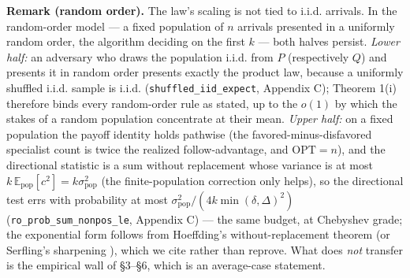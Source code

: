 \textbf{Remark (random order).} The law's scaling is not tied to i.i.d.
arrivals. In the random-order model --- a fixed population of \(n\)
arrivals presented in a uniformly random order, the algorithm deciding
on the first \(k\) --- both halves persist. \emph{Lower half:} an
adversary who draws the population i.i.d. from \(P\) (respectively
\(Q\)) and presents it in random order presents exactly the product law,
because a uniformly shuffled i.i.d. sample is i.i.d.
(\texttt{shuffled\_iid\_expect}, Appendix C); Theorem 1(i) therefore
binds every random-order rule as stated, up to the \(o(1)\) by which the
stakes of a random population concentrate at their mean. \emph{Upper
half:} on a fixed population the payoff identity holds pathwise (the
favored-minus-disfavored specialist count is twice the realized
follow-advantage, and \(\mathrm{OPT}=n\)), and the directional statistic
is a sum without replacement whose variance is at most
\(k\,\mathbb E_{\mathrm{pop}}[c^2]=k\sigma^2_{\mathrm{pop}}\) (the
finite-population correction only helps), so the directional test errs
with probability at most
\(\sigma^2_{\mathrm{pop}}/(4k\min(\delta,\Delta)^2)\)
(\texttt{ro\_prob\_sum\_nonpos\_le}, Appendix C) --- the same budget, at
Chebyshev grade; the exponential form follows from Hoeffding's
without-replacement theorem \cite{hoeffding1963probability} (or
Serfling's sharpening \cite{serfling1974probability}), which we cite
rather than reprove. What does \emph{not} transfer is the empirical wall
of §3--§6, which is an average-case statement.
